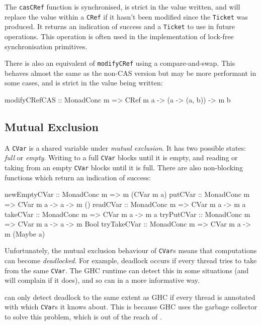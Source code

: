 The \verb|casCRef| function is synchronised, is strict in the value
written, and will replace the value within a \verb|CRef| if it hasn't
been modified since the \verb|Ticket| was produced. It returns an
indication of success and a \verb|Ticket| to use in future
operations. This operation is often used in the implementation of
lock-free synchronisation primitives.

There is also an equivalent of \verb|modifyCRef| using a
compare-and-swap. This behaves almost the same as the non-CAS version
but may be more performant in some cases, and is strict in the value
being written:

\begin{haskellcode}
modifyCRefCAS :: MonadConc m => CRef m a -> (a -> (a, b)) -> m b
\end{haskellcode}

\subsection{Mutual Exclusion}
\label{sec:abstraction-typeclass-cvars}

A \verb|CVar| is a shared variable under \emph{mutual exclusion}. It
has two possible states: \emph{full} or \emph{empty}. Writing to a
full \verb|CVar| blocks until it is empty, and reading or taking from
an empty \verb|CVar| blocks until it is full. There are also
non-blocking functions which return an indication of success:

\begin{haskellcode}
newEmptyCVar :: MonadConc m => m (CVar m a)
putCVar      :: MonadConc m => CVar m a -> a -> m ()
readCVar     :: MonadConc m => CVar m a -> m a
takeCVar     :: MonadConc m => CVar m a -> m a
tryPutCVar   :: MonadConc m => CVar m a -> a -> m Bool
tryTakeCVar  :: MonadConc m => CVar m a -> m (Maybe a)
\end{haskellcode}

Unfortunately, the mutual exclusion behaviour of \verb|CVar|s means
that computations can become \emph{deadlocked}. For example, deadlock
occurs if every thread tries to take from the same \verb|CVar|. The
GHC runtime can detect this in some situations (and will complain if
it does), and so can \dejafu{} in a more informative way.

\begin{departure}
  \dejafu{} can only detect deadlock to the same extent as GHC if
  every thread is annotated with which \verb|CVar|s it knows
  about. This is because GHC uses the garbage collector to solve this
  problem, which is out of the reach of \dejafu{}.
\end{departure}

